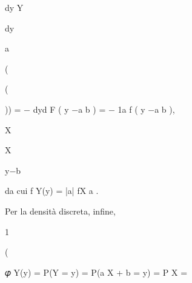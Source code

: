 \documentclass[a4paper,portrait,12pt]{article}
\begin{document}
\begin{flushleft}
dy Y
\end{flushleft}


\begin{flushleft}
dy
\end{flushleft}


\begin{flushleft}
a
\end{flushleft}





(





(





\begin{flushleft}
)) = $-$ dyd F ( y $-$a b ) = $-$ 1a f ( y $-$a b ),
\end{flushleft}


\begin{flushleft}
X
\end{flushleft}





\begin{flushleft}
X
\end{flushleft}





\begin{flushleft}
y$-$b
\end{flushleft}





\begin{flushleft}
da cui f Y(y) = |a| fX a .
\end{flushleft}


\begin{flushleft}
Per la densit\`{a} discreta, infine,
\end{flushleft}


1





(





\begin{flushleft}
𝜑 Y(y) = P(Y = y) = P(a X + b = y) = P X =
\end{flushleft}
\end{document}
